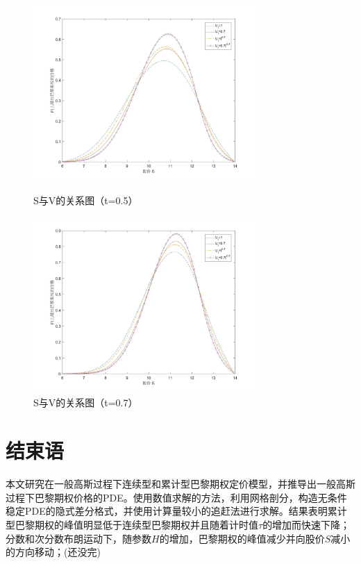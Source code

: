 \documentclass{ctexart} %
\begin{document}
\begin{figure}[H]
\begin{minipage}{0.48\linewidth}
\includegraphics[width=8.5cm]{code/t0.5.jpg}
\caption{S与V的关系图（t=0.5）}
\end{minipage}
\begin{minipage}{0.48\linewidth}
\includegraphics[width=8.5cm]{code/t0.7.jpg}
\caption{S与V的关系图（t=0.7）}
\end{minipage}
\end{figure}





\section{结束语}
本文研究在一般高斯过程下连续型和累计型巴黎期权定价模型，并推导出一般高斯过程下巴黎期权价格的PDE。使用数值求解的方法，利用网格剖分，构造无条件稳定PDE的隐式差分格式，并使用计算量较小的追赶法进行求解。结果表明累计型巴黎期权的峰值明显低于连续型巴黎期权并且随着计时值$\tau$的增加而快速下降；分数和次分数布朗运动下，随参数$H$的增加，巴黎期权的峰值减少并向股价$S$减小的方向移动；(还没完) 
\end{document}
